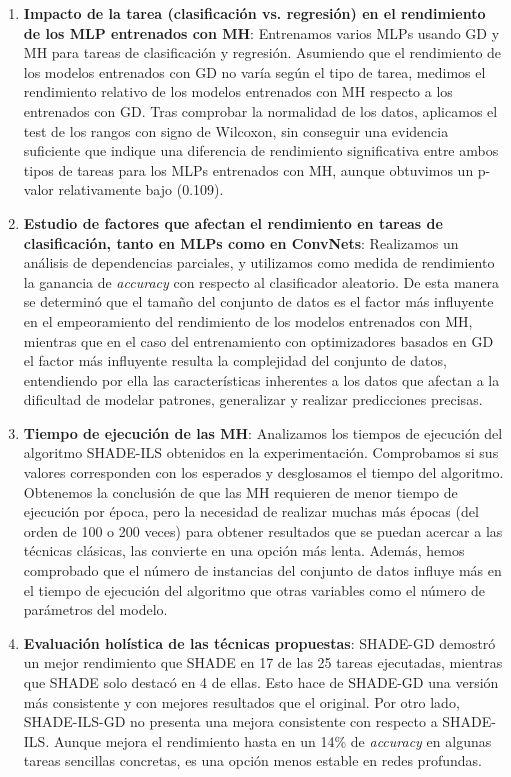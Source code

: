 \begin{enumerate}

\item \textbf{Impacto de la tarea (clasificación vs. regresión) en el rendimiento de los MLP entrenados con MH}: Entrenamos varios MLPs usando GD y MH para tareas de clasificación y regresión. Asumiendo que el rendimiento de los modelos entrenados con GD no varía según el tipo de tarea, medimos el rendimiento relativo de los modelos entrenados con MH respecto a los entrenados con GD. Tras comprobar la normalidad de los datos, aplicamos el test de los rangos con signo de Wilcoxon, sin conseguir una evidencia suficiente que indique una diferencia de rendimiento significativa entre ambos tipos de tareas para los MLPs entrenados con MH, aunque obtuvimos un p-valor relativamente bajo (0.109).

\item \textbf{Estudio de factores que afectan el rendimiento en tareas de clasificación, tanto en MLPs como en ConvNets}: Realizamos un análisis de dependencias parciales, y utilizamos como medida de rendimiento la ganancia de \textit{accuracy} con respecto al clasificador aleatorio. De esta manera se determinó que el tamaño del conjunto de datos es el factor más influyente en el empeoramiento del rendimiento de los modelos entrenados con MH, mientras que en el caso del entrenamiento con optimizadores basados en GD el factor más influyente resulta la complejidad del conjunto de datos, entendiendo por ella las características inherentes a los datos que afectan a la dificultad de modelar patrones, generalizar y realizar predicciones precisas.



\item \textbf{Tiempo de ejecución de las MH}: Analizamos los tiempos de ejecución del algoritmo SHADE-ILS obtenidos en la experimentación. Comprobamos si sus valores corresponden con los esperados y desglosamos el tiempo del algoritmo. Obtenemos la conclusión de que las MH requieren de menor tiempo de ejecución por época, pero la necesidad de realizar muchas más épocas (del orden de 100 o 200 veces) para obtener resultados que se puedan acercar a las técnicas clásicas, las convierte en una opción más lenta. Además, hemos comprobado que el número de instancias del conjunto de datos influye más en el tiempo de ejecución del algoritmo que otras variables como el número de parámetros del modelo.



\item \textbf{Evaluación holística de las técnicas propuestas}: SHADE-GD demostró un mejor rendimiento que SHADE en 17 de las 25 tareas ejecutadas, mientras que SHADE solo destacó en 4 de ellas. Esto hace de SHADE-GD una versión más consistente y con mejores resultados que el original. Por otro lado, SHADE-ILS-GD no presenta una mejora consistente con respecto a SHADE-ILS. Aunque mejora el rendimiento hasta en un 14\% de \textit{accuracy} en algunas tareas sencillas concretas, es una opción menos estable en redes profundas.


\end{enumerate}

